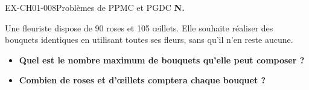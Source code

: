 \begin{exercice}{EX-CH01-008}{Problèmes de PPMC et PGDC}
\bigskip\textbf{N.}

\medskip
Une fleuriste dispose de 90 roses et 105 œillets. Elle souhaite réaliser des bouquets identiques en utilisant toutes ses fleurs, sans qu'il n'en reste aucune.

\begin{itemize}[label=$\blacktriangleright$]
\item \textbf{Quel est le nombre maximum de bouquets qu'elle peut composer ?}
\item \textbf{Combien de roses et d'œillets comptera chaque bouquet ?}
\end{itemize}

\end{exercice}



